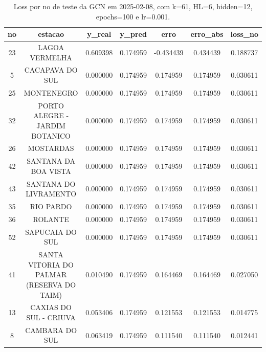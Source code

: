 \begin{table}[h]
\centering
\caption{Loss por no de teste da GCN em 2025-02-08, com k=61, HL=6, hidden=12, epochs=100 e lr=0.001.}
\label{tab:gcn_loss_k61_hl6_h12_e100_d20250208}
\begin{tabular}{ccccccc}
\toprule
no & estacao & y\_real & y\_pred & erro & erro\_abs & loss\_no \\
\midrule
23 & LAGOA VERMELHA & 0.609398 & 0.174959 & -0.434439 & 0.434439 & 0.188737 \\
5 & CACAPAVA DO SUL & 0.000000 & 0.174959 & 0.174959 & 0.174959 & 0.030611 \\
25 & MONTENEGRO & 0.000000 & 0.174959 & 0.174959 & 0.174959 & 0.030611 \\
32 & PORTO ALEGRE - JARDIM BOTANICO & 0.000000 & 0.174959 & 0.174959 & 0.174959 & 0.030611 \\
26 & MOSTARDAS & 0.000000 & 0.174959 & 0.174959 & 0.174959 & 0.030611 \\
42 & SANTANA DA BOA VISTA & 0.000000 & 0.174959 & 0.174959 & 0.174959 & 0.030611 \\
43 & SANTANA DO LIVRAMENTO & 0.000000 & 0.174959 & 0.174959 & 0.174959 & 0.030611 \\
35 & RIO PARDO & 0.000000 & 0.174959 & 0.174959 & 0.174959 & 0.030611 \\
36 & ROLANTE & 0.000000 & 0.174959 & 0.174959 & 0.174959 & 0.030611 \\
52 & SAPUCAIA DO SUL & 0.000000 & 0.174959 & 0.174959 & 0.174959 & 0.030611 \\
41 & SANTA VITORIA DO PALMAR (RESERVA DO TAIM) & 0.010490 & 0.174959 & 0.164469 & 0.164469 & 0.027050 \\
13 & CAXIAS DO SUL - CRIUVA & 0.053406 & 0.174959 & 0.121553 & 0.121553 & 0.014775 \\
8 & CAMBARA DO SUL & 0.063419 & 0.174959 & 0.111540 & 0.111540 & 0.012441 \\
\bottomrule
\end{tabular}
\end{table}

